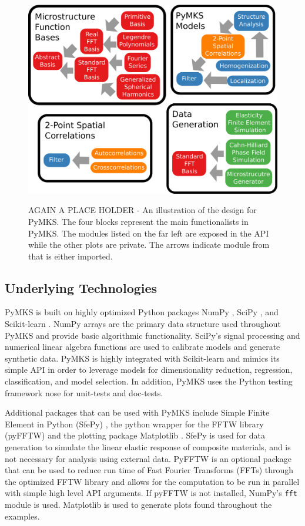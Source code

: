 \documentclass{bmcart}
\begin{document}
\begin{figure}[h!]
  \caption{
      AGAIN A PLACE HOLDER - An illustration of the design for PyMKS. The four blocks represent the main functionalists in PyMKS. The modules listed on the far left are exposed in the API  while the other plots are private. The arrows indicate module from
      that is either imported.}
    \includegraphics[scale=.5]{fig/pymksOrganization3.png}
  \label{fig:pymks_design}
\end{figure}


\subsection{Underlying Technologies}

PyMKS is built on highly optimized Python packages NumPy \cite{van2011numpy}, SciPy \cite{jones2014scipy}, and Scikit-learn \cite{pedregosa2011scikit}. NumPy arrays are the primary data structure used throughout PyMKS and provide basic algorithmic functionality. SciPy's signal processing and numerical linear algebra functions are used to calibrate models and generate synthetic data. PyMKS is highly integrated with Scikit-learn and mimics its simple API in order to leverage models for dimensionality reduction, regression, classification, and model selection. In addition, PyMKS uses the Python testing framework nose for unit-tests and doc-tests.

Additional packages that can be used with PyMKS include Simple Finite Element in Python (SfePy) \cite{cimrman2014sfepy}, the python wrapper for the FFTW library (pyFFTW) \cite{frigo1998fftw} and the plotting package Matplotlib \cite{hunter2007matplotlib}. SfePy is used for data generation to simulate the linear elastic response of composite materials, and is not necessary for analysis using external data. PyFFTW is an optional package that can be used to reduce run time of Fast Fourier Transforms (FFTs) through the optimized FFTW library and allows for the computation to be run in parallel with simple high level API arguments. If pyFFTW is not installed, NumPy's \texttt{fft} module is used. Matplotlib is used to generate plots found throughout the examples.
\end{document}
